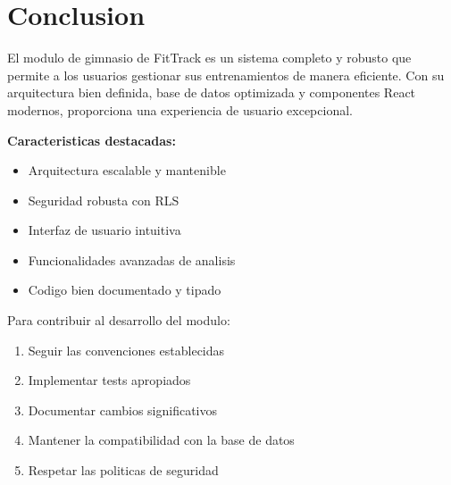 \documentclass[12pt,a4paper]{article}
\begin{document}
\section{Conclusion}

El modulo de gimnasio de FitTrack es un sistema completo y robusto que permite a los usuarios gestionar sus entrenamientos de manera eficiente. Con su arquitectura bien definida, base de datos optimizada y componentes React modernos, proporciona una experiencia de usuario excepcional.

\textbf{Caracteristicas destacadas:}
\begin{itemize}
    \item Arquitectura escalable y mantenible
    \item Seguridad robusta con RLS
    \item Interfaz de usuario intuitiva
    \item Funcionalidades avanzadas de analisis
    \item Codigo bien documentado y tipado
\end{itemize}

Para contribuir al desarrollo del modulo:
\begin{enumerate}
    \item Seguir las convenciones establecidas
    \item Implementar tests apropiados
    \item Documentar cambios significativos
    \item Mantener la compatibilidad con la base de datos
    \item Respetar las politicas de seguridad
\end{enumerate}
\end{document}
